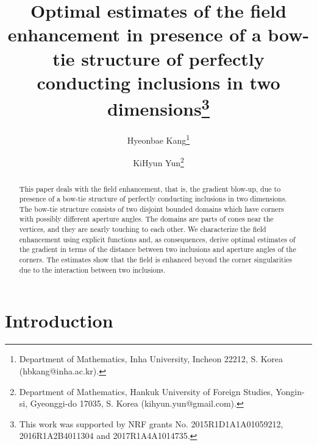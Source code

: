\documentclass[11pt,a4paper]{article}
\numberwithin{equation}{section}
\begin{document}
\title{Optimal estimates of the field enhancement in presence of a bow-tie structure of perfectly conducting inclusions in two dimensions\thanks{\footnotesize This work was
supported by NRF grants No. 2015R1D1A1A01059212, 2016R1A2B4011304 and 2017R1A4A1014735.}}


\author{Hyeonbae Kang\thanks{\footnotesize Department of Mathematics, Inha University, Incheon
22212, S. Korea (hbkang@inha.ac.kr).} \and KiHyun Yun\thanks{\footnotesize Department of Mathematics, Hankuk University of Foreign Studies, Yongin-si, Gyeonggi-do 17035, S. Korea (kihyun.yun@gmail.com).}}


\maketitle

\begin{abstract}
This paper deals with the field enhancement, that is, the gradient blow-up, due to presence of a bow-tie structure of perfectly conducting inclusions in two dimensions. The bow-tie structure consists of two disjoint bounded domains which have corners with possibly different aperture angles. The domains are parts of cones near the vertices, and they are nearly touching to each other.  We characterize the field enhancement using explicit functions and, as consequences, derive optimal estimates of the gradient in terms of the distance between two inclusions and aperture angles of the corners. The estimates show that the field is enhanced beyond the corner singularities due to the interaction between two inclusions.
\end{abstract}




\section{Introduction}
\end{document}
